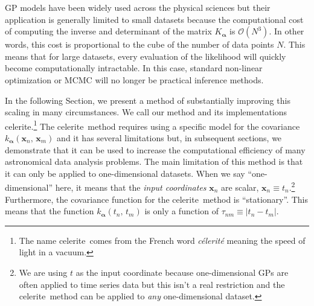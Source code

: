 \documentclass[manuscript, letterpaper]{aastex6}
\makeatletter
\let\origsection\section
\renewcommand\section{\@ifstar{\starsection}{\nostarsection}}
\newcommand\nostarsection[1]{\sectionprelude\origsection{#1}}
\newcommand\starsection[1]{\sectionprelude\origsection*{#1}}
\newcommand\sectionprelude{\vspace{1em}}
\newcommand{\project}[1]{\textsf{#1}}
\newcommand{\celerite}{\project{celerite}}
\newcommand{\foreign}[1]{\emph{#1}}
\newcommand{\bvec}[1]{{\ensuremath{\boldsymbol{#1}}}}
\makeatother
\begin{document}
GP models have been widely used across the physical sciences but their
application is generally limited to small datasets because the computational
cost of computing the inverse and determinant of the matrix $K_\bvec{\alpha}$
is $\mathcal{O}(N^3)$.
In other words, this cost is proportional to the cube of the number of data
points $N$.
This means that for large datasets, every evaluation of the likelihood will
quickly become computationally intractable.
In this case, standard non-linear optimization or MCMC will no longer be
practical inference methods.

In the following Section, we present a method of substantially improving this
scaling in many circumstances.
We call our method and its implementations \celerite.\footnote{The name
\celerite\ comes from the French word \foreign{c\'elerit\'e} meaning the speed
of light in a vacuum.} The \celerite\ method requires using a specific model
for the covariance $k_\bvec{\alpha}(\bvec{x}_n,\,\bvec{x}_m)$ and it has
several limitations but, in subsequent sections, we demonstrate that it can be
used to increase the computational efficiency of many astronomical data
analysis problems.
The main limitation of this method is that it can only be applied to
one-dimensional datasets.
When we say ``one-dimensional'' here, it means that the \emph{input
coordinates} $\bvec{x}_n$ are scalar, $\bvec{x}_n \equiv t_n$.\footnote{We are
using $t$ as the input coordinate because one-dimensional GPs are often
applied to time series data but this isn't a real restriction and the \celerite\
method can be applied to \emph{any} one-dimensional dataset.}
Furthermore, the covariance function for the \celerite\ method is ``stationary''.
This means that the function $k_\bvec{\alpha}(t_n,\,t_m)$ is only a function
of $\tau_{nm} \equiv |t_n - t_m|$.


\section{The celerite model}
\end{document}
